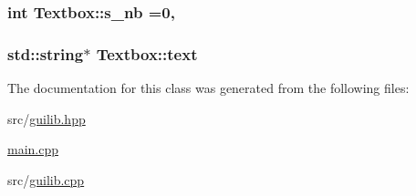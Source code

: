 \subsubsection[{\texorpdfstring{s\+\_\+nb}{s_nb}}]{\setlength{\rightskip}{0pt plus 5cm}int Textbox\+::s\+\_\+nb =0\hspace{0.3cm}{\ttfamily [static]}, {\ttfamily [private]}}\hypertarget{class_textbox_a2597b1b404605ad4e1c7a10cc0f2cbbb}{}\label{class_textbox_a2597b1b404605ad4e1c7a10cc0f2cbbb}
\subsubsection[{\texorpdfstring{text}{text}}]{\setlength{\rightskip}{0pt plus 5cm}std\+::string$\ast$ Textbox\+::text\hspace{0.3cm}{\ttfamily [private]}}\hypertarget{class_textbox_a8d7b684614a1fa936ed71761faadafcb}{}\label{class_textbox_a8d7b684614a1fa936ed71761faadafcb}


The documentation for this class was generated from the following files\+:\begin{DoxyCompactItemize}
\item 
src/\hyperlink{guilib_8hpp}{guilib.\+hpp}\item 
\hyperlink{main_8cpp}{main.\+cpp}\item 
src/\hyperlink{guilib_8cpp}{guilib.\+cpp}\end{DoxyCompactItemize}
